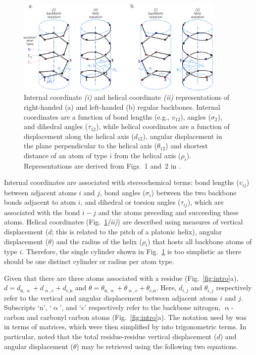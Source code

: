 \documentclass[fleqn,10pt,lineno]{wlpeerj} %
\newcommand{\n}[1]{{\color{black}#1}} %
\newcommand{\Fig}[1]{Fig.~\ref{#1}}
\begin{document}
\begin{figure}[t!]
\mbox{}\hfill
\includegraphics[width=0.9\textwidth]{./figures/helix_peptide.pdf}
\hfill\mbox{}\hfill\mbox{}\newline
\caption{\label{fig:helix}
Internal coordinate \textit{(i)} and helical coordinate \textit{(ii)} representations of right-handed (a) and left-handed (b) regular backbones. Internal coordinates are a function of bond lengths (e.g., $v_{12}$), angles ($\sigma_{2}$), and dihedral angles ($\tau_{12}$), while helical coordinates are a function of displacement along the helical axis ($d_{12}$), angular displacement in the plane perpendicular to the helical axis ($\theta_{12}$) and shortest distance of an atom \n{of type $i$} from the helical axis ($\rho_i$). Representations are derived from Figs.~1 and~2 in  \cite{Shimanouchi1955}.
}
\end{figure}

Internal coordinates are associated with stereochemical terms: bond lengths ($v_{ij}$) between adjacent atoms $i$ and $j$, bond angles ($\sigma_{i}$) between the two backbone bonds adjacent to atom $i$, and dihedral or torsion angles ($\tau_{ij}$), which are associated with the bond $i-j$ and the atoms preceding and succeeding these atoms. Helical coordinates (\Fig{fig:helix}\textit{(ii)}) are described using measures of vertical displacement ($d$; this is related to the pitch of a platonic helix), angular displacement ($\theta$) \n{and the radius of the helix ($\rho_i$) that hosts all backbone atoms of type $i$. Therefore, the single cylinder shown in \Fig{fig:helix} is too simplistic as there should be one distinct cylinder or radius per atom type.}

Given that there are three atoms associated with a residue (\Fig{fig:intro}a), \n{$d = d_{\textrm{n},\upalpha}+d_{\upalpha,\textrm{c}}+d_{\textrm{c},\textrm{n}}$ and $\theta = \theta_{\textrm{n},\upalpha}+\theta_{\upalpha,\textrm{c}}+\theta_{\textrm{c},\textrm{n}}$. Here, $d_{i,j}$ and $\theta_{i,j}$ respectively refer to the vertical and angular displacement between adjacent atoms $i$ and $j$. Subscripts `$\textrm{n}$', `$\upalpha$', and `$\textrm{c}$' respectively refer to the backbone nitrogen, $\upalpha$-carbon and carbonyl carbon atoms (\Fig{fig:intro}a).} The notation used by \cite{Shimanouchi1955} was in terms of matrices, which were then simplified by \cite{Miyazawa1961} into trigonometric terms. In particular, \cite{Miyazawa1961} noted that the total residue-residue vertical displacement ($d$) and angular displacement ($\theta$) may be retrieved using the following two equations.
\end{document}
